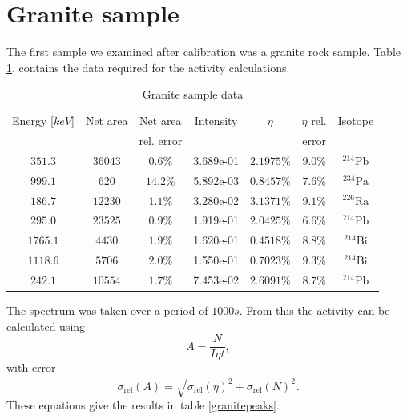 \documentclass[pdftex,12pt,a4paper]{article}
\begin{document}
	\section{Granite sample}
		The first sample we examined after calibration was a granite rock sample. Table \ref{granitedata}. contains the data required for the activity calculations.
		\begin{table}[H]
		\centering
		\begin{tabular}{|c|c|c|c|c|c|c|}
			\hline
			Energy [$keV$] & Net area & Net area   & Intensity & $\eta$ & $\eta$ rel. & Isotope \\
			               &          & rel. error &           &        & error       &         \\
			\hline
            $351.3$ & $36043$ & $0.6\%$ & 3.689e-01 & $2.1975\%$ & $9.0\%$ & $^{214}\text{Pb}$ \\
            $999.1$ & $620$ & $14.2\%$ & 5.892e-03 & $0.8457\%$ & $7.6\%$ & $^{234}\text{Pa}$ \\
            $186.7$ & $12230$ & $1.1\%$ & 3.280e-02 & $3.1371\%$ & $9.1\%$ & $^{226}\text{Ra}$ \\
            $295.0$ & $23525$ & $0.9\%$ & 1.919e-01 & $2.0425\%$ & $6.6\%$ & $^{214}\text{Pb}$ \\
            $1765.1$ & $4430$ & $1.9\%$ & 1.620e-01 & $0.4518\%$ & $8.8\%$ & $^{214}\text{Bi}$ \\
            $1118.6$ & $5706$ & $2.0\%$ & 1.550e-01 & $0.7023\%$ & $9.3\%$ & $^{214}\text{Bi}$ \\
            $242.1$ & $10554$ & $1.7\%$ & 7.453e-02 & $2.6091\%$ & $8.7\%$ & $^{214}\text{Pb}$ \\
			\hline
		\end{tabular}
		\caption{Granite sample data}
		 \label{granitedata}
		\end{table}
		The spectrum was taken over a period of $1000s$. From this the activity can be calculated using
		\begin{equation}
			A = \frac{N}{I\eta t},
			\label{activity}
		\end{equation}
		with error
		\begin{equation}
			\sigma_{\text{rel}}(A) = \sqrt{\sigma_{\text{rel}}(\eta)^2 + \sigma_{\text{rel}}(N)^2}.
		\end{equation}
		These equations give the results in table \ref{granitepeaks}.
\end{document}
